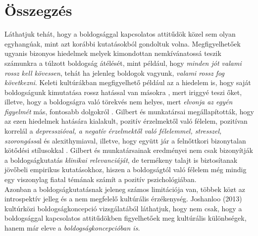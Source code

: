 \section{Összegzés}
Láthatjuk tehát, hogy a boldogsággal kapcsolatos attitűdök közel sem olyan egyhangúak, mint azt korábbi kutatásokból gondoltuk volna. Megfigyelhetőek ugyanis bizonyos hiedelmek \cite{joshanloo_weijers_2013} melyek kimondottan nemkívána\-tossá teszik számunkra a túlzott boldogság átélését, mint például, hogy \textit{minden jót valami rossz kell kövessen}, tehát ha jelenleg boldogok vagyunk, \textit{valami rossz fog következni}. Keleti kultúrákban megfigyelhető például az a hiedelem is, hogy saját boldogságunk kimutatása rossz hatással van másokra \cite{joshanloo_weijers_2013}, mert iriggyé teszi őket, illetve, hogy a boldogságra való törekvés nem helyes, mert \textit{elvonja az egyén figyelmét} más, fontosabb dolgokról \cite{joshanloo_weijers_2013}. Gilbert és munkatársai megállapították, hogy az ezen hiedelmek hatására kialakult, pozitív érzelmektől való félelem, pozitívan korrelál a \textit{depresszióval, a negatív érzelmektől való félelemmel, stresszel, szorongássa}l és alexithymiaval, illetve, hogy együtt jár a felnőttkori bizonytalan kötődési stílusokkal \cite{gilbert_mcewan_catarino_baiao_palmeira_2013}. Gilbert és munkatársainak eredményei nem csak bizonyítják a boldogságkutatás \textit{klinikai relevanciáját}, de termékeny talajt is biztosítanak jövőbeli empirikus kutatásokhoz, hiszen a boldogságtól való félelem még mindig egy viszonylag fiatal témának számít a pozitív pszichológiában. \\
Azonban a boldogságkutatásnak jeleneg számos limitációja van, többek közt az introspektív jelleg és a nem megfelelő kultúrális érzékenység. Joshanloo (2013) kultúrközi boldogságkoncepció vizsgálatából láthatjuk, hogy nem csak, hogy a boldog\-sággal kapcsolatos attitűdökben figyelhetőek meg kultúrális különbségek, hanem már eleve a \textit{boldogságkoncepcióban is.}













































